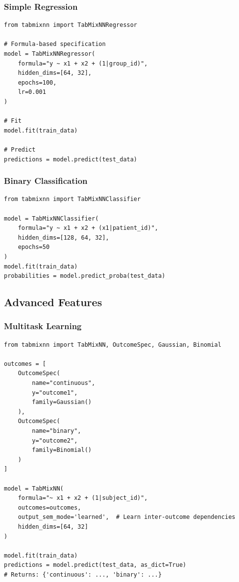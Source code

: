 \documentclass[12pt,a4paper]{article}
\begin{document}
\subsubsection{Simple Regression}

\begin{lstlisting}
from tabmixnn import TabMixNNRegressor

# Formula-based specification
model = TabMixNNRegressor(
    formula="y ~ x1 + x2 + (1|group_id)",
    hidden_dims=[64, 32],
    epochs=100,
    lr=0.001
)

# Fit
model.fit(train_data)

# Predict
predictions = model.predict(test_data)
\end{lstlisting}

\subsubsection{Binary Classification}

\begin{lstlisting}
from tabmixnn import TabMixNNClassifier

model = TabMixNNClassifier(
    formula="y ~ x1 + x2 + (x1|patient_id)",
    hidden_dims=[128, 64, 32],
    epochs=50
)
model.fit(train_data)
probabilities = model.predict_proba(test_data)
\end{lstlisting}

\subsection{Advanced Features}

\subsubsection{Multitask Learning}

\begin{lstlisting}
from tabmixnn import TabMixNN, OutcomeSpec, Gaussian, Binomial

outcomes = [
    OutcomeSpec(
        name="continuous",
        y="outcome1",
        family=Gaussian()
    ),
    OutcomeSpec(
        name="binary",
        y="outcome2",
        family=Binomial()
    )
]

model = TabMixNN(
    formula="~ x1 + x2 + (1|subject_id)",
    outcomes=outcomes,
    output_sem_mode='learned',  # Learn inter-outcome dependencies
    hidden_dims=[64, 32]
)

model.fit(train_data)
predictions = model.predict(test_data, as_dict=True)
# Returns: {'continuous': ..., 'binary': ...}
\end{lstlisting}
\end{document}
